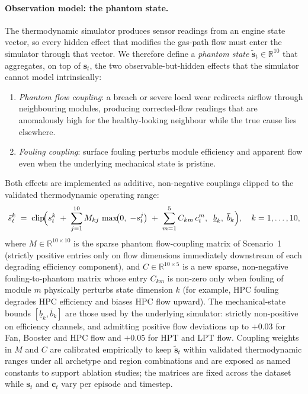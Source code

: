 \paragraph{Observation model: the phantom state.}
The thermodynamic simulator produces sensor readings from an engine
state vector, so every hidden effect that modifies the gas-path flow
must enter the simulator through that vector. We therefore define a
\emph{phantom state} $\tilde{\mathbf{s}}_t \in \mathbb{R}^{10}$
that aggregates, on top of $\mathbf{s}_t$, the two observable-but-hidden
effects that the simulator cannot model intrinsically:
\begin{enumerate}
  \item \emph{Phantom flow coupling}: a breach or severe local wear
    redirects airflow through neighbouring modules, producing
    corrected-flow readings that are anomalously high for the
    healthy-looking neighbour while the true cause lies elsewhere.
  \item \emph{Fouling coupling}: surface fouling perturbs module
    efficiency and apparent flow even when the underlying mechanical
    state is pristine.
\end{enumerate}
Both effects are implemented as additive, non-negative couplings
clipped to the validated thermodynamic operating range:
\begin{equation}
  \tilde{s}^k_t \;=\; \mathrm{clip}\!\Bigl(
     s^k_t
     \;+\; \sum_{j=1}^{10} M_{kj}\,\max\!\bigl(0,\; -s^j_t\bigr)
     \;+\; \sum_{m=1}^{5} C_{km}\, c^m_t,
  \;\; \underline{b}_k,\; \overline{b}_k \Bigr),
  \quad k = 1,\ldots,10,
  \label{eq:phantom}
\end{equation}
where $M \in \mathbb{R}^{10 \times 10}$ is the sparse phantom
flow-coupling matrix of Scenario~1 (strictly positive entries only on
flow dimensions immediately downstream of each degrading efficiency
component), and $C \in \mathbb{R}^{10 \times 5}$ is a new sparse,
non-negative fouling-to-phantom matrix whose entry $C_{km}$ is
non-zero only when fouling of module $m$ physically perturbs state
dimension $k$ (for example, HPC fouling degrades HPC efficiency
and biases HPC flow upward). The mechanical-state bounds
$[\underline{b}_k, \overline{b}_k]$ are those used by the underlying
simulator: strictly non-positive on efficiency channels, and admitting
positive flow deviations up to $+0.03$ for Fan, Booster and HPC flow
and $+0.05$ for HPT and LPT flow. Coupling weights in $M$ and $C$ are
calibrated empirically to keep $\tilde{\mathbf{s}}_t$ within validated
thermodynamic ranges under all archetype and region combinations and
are exposed as named constants to support ablation studies; the
matrices are fixed across the dataset while $\mathbf{s}_t$ and
$\mathbf{c}_t$ vary per episode and timestep.

